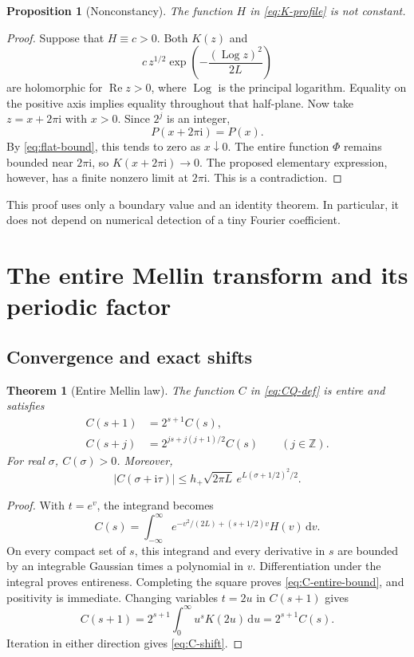 \documentclass[11pt,a4paper]{article}
\numberwithin{equation}{section}
\newtheorem{theorem}{Theorem}[section]
\newtheorem{proposition}[proposition]{Proposition}
\theoremstyle{definition}
\theoremstyle{remark}
\newcommand{\Z}{\mathbb Z}
\newcommand{\ii}{\mathrm i}
\newcommand{\dd}{\,\mathrm d}
\DeclareMathOperator{\Log}{Log}
\newcommand{\Rea}{\operatorname{Re}}
\newcommand{\abs}[1]{\left|#1\right|}
\begin{document}
\begin{proposition}[Nonconstancy]
\label{prop:H-nonconstant}
The function $H$ in \cref{eq:K-profile} is not constant.
\end{proposition}
\begin{proof}
Suppose that $H\equiv c>0$. Both $K(z)$ and
\[
 c\,z^{1/2}\exp\left(-\frac{(\Log z)^2}{2L}\right)
\]
are holomorphic for $\Rea z>0$, where $\Log$ is the principal
logarithm. Equality on the positive axis implies equality throughout
that half-plane. Now take $z=x+2\pi\ii$ with $x>0$. Since $2^j$ is
an integer,
\[
 P(x+2\pi\ii)=P(x).
\]
By \cref{eq:flat-bound}, this tends to zero as $x\downarrow0$.
The entire function $\Phi$ remains bounded near $2\pi\ii$, so
$K(x+2\pi\ii)\to0$. The proposed elementary expression, however,
has a finite nonzero limit at $2\pi\ii$. This is a contradiction.
\end{proof}

This proof uses only a boundary value and an identity theorem. In
particular, it does not depend on numerical detection of a tiny
Fourier coefficient.

\section{The entire Mellin transform and its periodic factor}
\label{sec:mellin}

\subsection{Convergence and exact shifts}
\begin{theorem}[Entire Mellin law]
\label{thm:C-entire}
The function $C$ in \cref{eq:CQ-def} is entire and satisfies
\begin{align}
 C(s+1)&=2^{s+1}C(s),\label{eq:C-step}\\
 C(s+j)&=2^{js+j(j+1)/2}C(s)\qquad(j\in\Z).
 \label{eq:C-shift}
\end{align}
For real $\sigma$, $C(\sigma)>0$. Moreover,
\begin{equation}
 \abs{C(\sigma+\ii\tau)}
 \le h_+\sqrt{2\pi L}\,
       e^{L(\sigma+1/2)^2/2}.
 \label{eq:C-entire-bound}
\end{equation}
\end{theorem}
\begin{proof}
With $t=e^v$, the integrand becomes
\begin{equation}
 C(s)=\int_{-\infty}^\infty
 e^{-v^2/(2L)+(s+1/2)v}H(v)\dd v.
 \label{eq:C-log-integral}
\end{equation}
On every compact set of $s$, this integrand and every derivative in
$s$ are bounded by an integrable Gaussian times a polynomial in $v$.
Differentiation under the integral proves entireness. Completing the
square proves \cref{eq:C-entire-bound}, and positivity is immediate.
Changing variables $t=2u$ in $C(s+1)$ gives
\[
 C(s+1)=2^{s+1}\int_0^\infty u^sK(2u)\dd u
       =2^{s+1}C(s).
\]
Iteration in either direction gives \cref{eq:C-shift}.
\end{proof}
\end{document}
